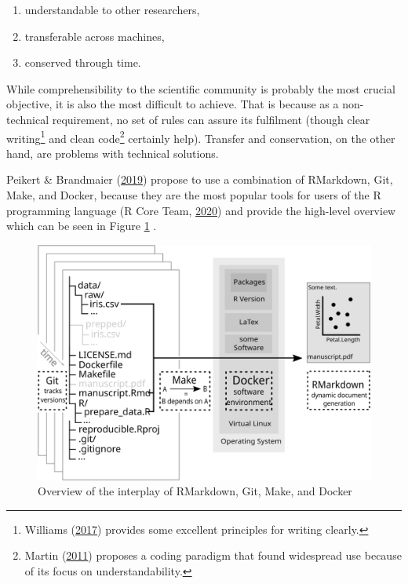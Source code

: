 \documentclass[12pt,a4paper,]{article}
\providecommand{\tightlist}{%
  \setlength{\itemsep}{0pt}\setlength{\parskip}{0pt}}
\begin{document}
\begin{enumerate}
\def\labelenumi{\arabic{enumi}.}
\tightlist
\item
  understandable to other researchers,
\item
  transferable across machines,
\item
  conserved through time.
\end{enumerate}

While comprehensibility to the scientific community is probably the most crucial objective, it is also the most difficult to achieve.
That is because as a non-technical requirement, no set of rules can assure its fulfilment (though clear writing\footnote{Williams (\protect\hyperlink{ref-williamsStyleLessonsClarity2017}{2017}) provides some excellent principles for writing clearly.} and clean code\footnote{Martin (\protect\hyperlink{ref-martinCleanCoderCode2011}{2011}) proposes a coding paradigm that found widespread use because of its focus on understandability.} certainly help).
Transfer and conservation, on the other hand, are problems with technical solutions.

Peikert \& Brandmaier (\protect\hyperlink{ref-peikertReproducibleDataAnalysis2019}{2019}) propose to use a combination of RMarkdown, Git, Make, and Docker, because they are the most popular tools for users of the R programming language (R Core Team, \protect\hyperlink{ref-R-base}{2020}) and provide the high-level overview which can be seen in Figure \ref{fig:nutshell} .

\begin{figure}

{\centering \includegraphics[width=1\linewidth]{images/nutshell} 

}

\caption{Overview of the interplay of RMarkdown, Git, Make, and Docker}\label{fig:nutshell}
\end{figure}
\end{document}
